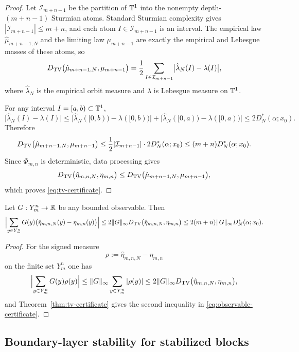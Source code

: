 \begin{proof}
Let $\mathcal{I}_{m+n-1}$ be the partition of $\mathbb{T}^1$ into the nonempty depth-$(m+n-1)$ Sturmian atoms. Standard Sturmian complexity gives $|\mathcal{I}_{m+n-1}|\le m+n$, and each atom $I\in\mathcal{I}_{m+n-1}$ is an interval. The empirical law $\hat{\mu}_{m+n-1,N}$ and the limiting law $\mu_{m+n-1}$ are exactly the empirical and Lebesgue masses of these atoms, so
\[
D_{\mathrm{TV}}\bigl(\hat{\mu}_{m+n-1,N},\mu_{m+n-1}\bigr)
=
\frac12\sum_{I\in\mathcal{I}_{m+n-1}}\bigl|\hat{\lambda}_N(I)-\lambda(I)\bigr|,
\]
where $\hat{\lambda}_N$ is the empirical orbit measure and $\lambda$ is Lebesgue measure on $\mathbb{T}^1$.

For any interval $I=[a,b)\subset\mathbb{T}^1$,
\[
\bigl|\hat{\lambda}_N(I)-\lambda(I)\bigr|
\le
\bigl|\hat{\lambda}_N([0,b))-\lambda([0,b))\bigr|
+
\bigl|\hat{\lambda}_N([0,a))-\lambda([0,a))\bigr|
\le 2D_N^*(\alpha;x_0).
\]
Therefore
\[
D_{\mathrm{TV}}\bigl(\hat{\mu}_{m+n-1,N},\mu_{m+n-1}\bigr)
\le
\frac12 |\mathcal{I}_{m+n-1}| \cdot 2D_N^*(\alpha;x_0)
\le
(m+n)D_N^*(\alpha;x_0).
\]
Since $\Phi_{m,n}$ is deterministic, data processing gives
\[
D_{\mathrm{TV}}\bigl(\hat{\eta}_{m,n,N},\eta_{m,n}\bigr)
\le
D_{\mathrm{TV}}\bigl(\hat{\mu}_{m+n-1,N},\mu_{m+n-1}\bigr),
\]
which proves \eqref{eq:tv-certificate}.
\end{proof}

\begin{corollary}\label{cor:observable-certificate}
Let $G:Y_m^n\to\mathbb{R}$ be any bounded observable. Then
\begin{equation}\label{eq:observable-certificate}
\Bigl|
\sum_{y\in Y_m^n}G(y)\bigl(\hat{\eta}_{m,n,N}(y)-\eta_{m,n}(y)\bigr)
\Bigr|
\le
2\|G\|_\infty D_{\mathrm{TV}}\bigl(\hat{\eta}_{m,n,N},\eta_{m,n}\bigr)
\le
2(m+n)\|G\|_\infty D_N^*(\alpha;x_0).
\end{equation}
\end{corollary}

\begin{proof}
For the signed measure
\[
\rho:=\hat{\eta}_{m,n,N}-\eta_{m,n}
\]
on the finite set $Y_m^n$ one has
\[
\Bigl|\sum_{y\in Y_m^n}G(y)\rho(y)\Bigr|
\le
\|G\|_\infty \sum_{y\in Y_m^n}|\rho(y)|
\le
2\|G\|_\infty D_{\mathrm{TV}}\bigl(\hat{\eta}_{m,n,N},\eta_{m,n}\bigr),
\]
and Theorem~\ref{thm:tv-certificate} gives the second inequality in \eqref{eq:observable-certificate}.
\end{proof}

\subsection{Boundary-layer stability for stabilized blocks}\label{sec:fp:tv:boundary}

